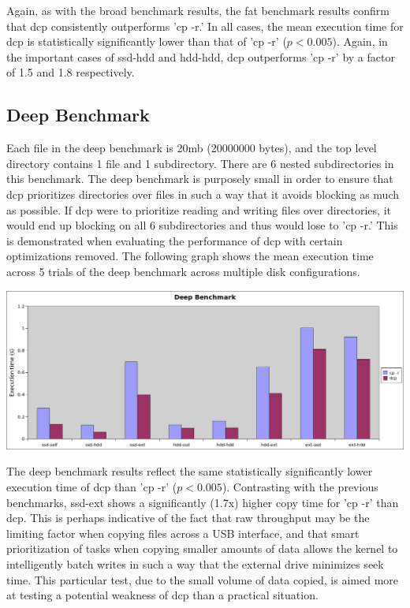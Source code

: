 \documentclass[12pt]{article}
\begin{document}
\vspace{5mm}

Again, as with the broad benchmark results, the fat benchmark results confirm that
dcp consistently outperforms 'cp -r.' In all cases, the mean execution time for
dcp is statistically significantly lower than that of 'cp -r' ($p < 0.005$).
Again, in the important cases of ssd-hdd and hdd-hdd, dcp outperforms 'cp -r'
by a factor of 1.5 and 1.8 respectively.

\subsection{Deep Benchmark}
Each file in the deep benchmark is 20mb (20000000 bytes), and
the top level directory contains 1 file and 1 subdirectory. There
are 6 nested subdirectories in this benchmark.
The deep benchmark is purposely small in order to ensure that dcp prioritizes
directories over files in such a way that it avoids blocking as much as possible.
If dcp were to prioritize reading and writing files over directories, it would end up
blocking on all 6 subdirectories and thus would lose to 'cp -r.' This is demonstrated
when evaluating the performance of dcp with certain optimizations removed. %
The following graph shows the mean execution time across 5 trials of the deep benchmark across multiple disk configurations.

\vspace{5mm}

\includegraphics[width=500pt]{graphs/deep-manydisk.png}

\vspace{5mm}

The deep benchmark results reflect the same statistically significantly lower
execution time of dcp than 'cp -r' ($p < 0.005$). Contrasting with the previous
benchmarks, ssd-ext shows a significantly (1.7x) higher copy time for 'cp -r' than
dcp. This is perhaps indicative of the fact that raw throughput may be the limiting
factor when copying files across a USB interface, and that smart prioritization of
tasks when copying smaller amounts of data allows the kernel to intelligently
batch writes in such a way that the external drive minimizes seek time. This particular
test, due to the small volume of data copied, is aimed more at testing a potential weakness
of dcp than a practical situation.
\end{document}
